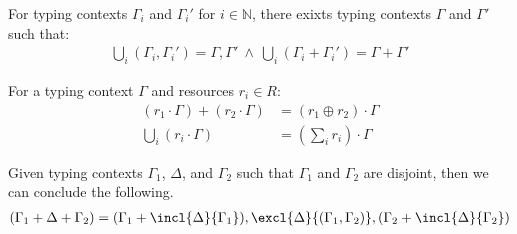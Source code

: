 \begin{lemma}
\label{lemma:shufflecomposition}
For typing contexts $\Gamma_i$ and $\Gamma_i'$ for $i\in \mathbb{N}$, there exixts typing contexts $\Gamma$ and $\Gamma'$ such that:
\begin{align*}
\bigcup_{i}(\Gamma_i,\Gamma_i') = \Gamma, \Gamma'\ \land\ \bigcup_i(\Gamma_i+\Gamma_i') = \Gamma + \Gamma'
\end{align*}
\end{lemma}

\begin{lemma}
\label{lemma:distributivelaw}
For a typing context $\Gamma$ and resources $r_i \in R$:
\begin{align*}
(r_1 \cdot \Gamma) + (r_2\cdot \Gamma) &= (r_1 \oplus r_2)\cdot\Gamma\\
\bigcup_i(r_i \cdot \Gamma) &= (\sum_i r_i)\cdot\Gamma
\end{align*}
\end{lemma}

\begin{lemma}
\label{lemma:collapse}
Given typing contexts $\Gamma_1$, $\Delta$, and $\Gamma_2$ such that $\Gamma_1$ and $\Gamma_2$ are disjoint, then we can conclude the following.
\begin{align*}
(\Gamma_1+\Delta+\Gamma_2) = (\Gamma_1+\incl{\Delta}{\Gamma_1}),\excl{\Delta}{(\Gamma_1,\Gamma_2)},(\Gamma_2+\incl{\Delta}{\Gamma_2})
\end{align*}
\end{lemma}






















